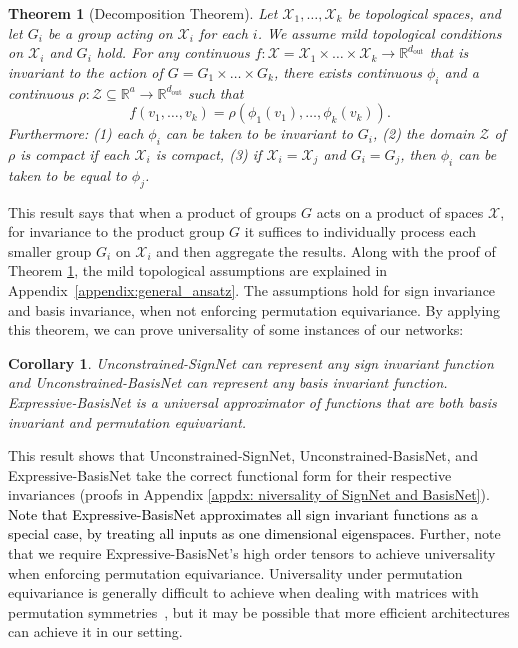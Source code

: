 \documentclass{article} \usepackage{iclr2023_conference,times}
\newcommand{\RR}{\mathbb R}
\newcommand{\mc}[1]{\mathcal{#1}}
\newcommand{\mrm}[1]{\mathrm{#1}}
\newcommand{\dout}{d_{\mrm{out}}}
\newtheorem{theorem}{Theorem}
\newtheorem{corollary}{Corollary}
\newcommand{\rebut}[1]{\textcolor{black}{#1}}
\begin{document}
\begin{theorem}[Decomposition Theorem]\label{thm:general_ansatz}
    Let $\mc X_1, \ldots, \mc X_k$ be  topological spaces, and let $G_i$ be a group acting on $\mc X_i$ for each $i$. We assume mild topological conditions on $\mc X_i$ and $G_i$ hold. For any continuous $f: \mc X = \mc X_1 \times \ldots \times \mc X_k \to \RR^{\dout}$  that is invariant to the action of $G = G_1 \times \ldots \times G_k$, there exists continuous $\phi_i$ and a continuous $\rho: \mc Z \subseteq \RR^a \to \RR^{\dout}$ such that
    \begin{equation}\label{eq:general_ansatz}
        f(v_1, \ldots, v_k) = \rho( \phi_1(v_1), \ldots,  \phi_k(v_k) ).
    \end{equation}
    Furthermore: (1) each $\phi_i$ can be taken to be invariant to $G_i$, (2) the domain $\mc Z$ of $\rho$ is compact if each $\mc X_i$ is compact, (3) if $\mc X_i = \mc X_j$ and $G_i = G_j$, then $\phi_i$ can be taken to be equal to $\phi_j$. 
\end{theorem}

This result says that when a product of groups $G$ acts on a product of spaces $\mc X$, for invariance to the product group $G$ it suffices to individually process each smaller group $G_i$ on $\mc X_i$ and then aggregate the results.
Along with the proof of Theorem \ref{thm:general_ansatz}, the mild topological assumptions are explained in Appendix~\ref{appendix:general_ansatz}.
The assumptions hold for sign invariance and basis invariance, when not enforcing permutation equivariance.
By applying this theorem, we can prove universality of some instances of our networks:

\begin{corollary}\label{cor:universal_net}
    Unconstrained-SignNet can represent any sign invariant function and Unconstrained-BasisNet can represent any basis invariant function. Expressive-BasisNet is a universal approximator of functions that are both basis invariant and permutation equivariant.
\end{corollary}

This result shows that Unconstrained-SignNet, Unconstrained-BasisNet, and Expressive-BasisNet 
take the correct functional form for their respective invariances  (proofs in Appendix \ref{appdx: niversality of SignNet and BasisNet}). \rebut{Note that Expressive-BasisNet approximates all sign invariant functions as a special case, by treating all inputs as one dimensional eigenspaces.} Further, note that we require Expressive-BasisNet's high order tensors to achieve universality when enforcing permutation equivariance. Universality under permutation equivariance is generally difficult to achieve when dealing with matrices with permutation symmetries~\citep{maron2019universality, keriven2019universal}, but it may be possible that more efficient architectures can achieve it in our setting.
\end{document}
